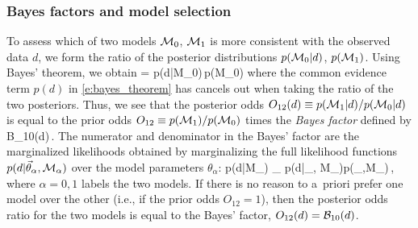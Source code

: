 \subsubsection{Bayes factors and model selection}
\label{s:bayes_factors}

To assess which of two models 
${\cal M}_0$, ${\cal M}_1$ is more consistent with
the observed data $d$, we form 
the ratio of the posterior distributions 
$p({\cal M}_0|d)$, $p({\cal M}_1)$.
Using Bayes' theorem, we obtain
\be
{} =
{p(d|{\cal M}_0)\,p({\cal M}_0)}
\ee
%
where the common evidence term $p(d)$ in
\eqref{e:bayes_theorem} has cancels out when taking
the ratio of the two posteriors.
Thus, we see that the posterior odds
$O_{12}(d)\equiv p({\cal M}_1|d)/p({\cal M}_0|d)$
is equal to the prior odds
$O_{12}\equiv p({\cal M}_1)/p({\cal M}_0)$
times the {\em Bayes factor} defined by
%
\be
{\cal B}_{10}(d)\equiv {}\,.
\label{e:bayes_factor}
\ee
%
The numerator and denominator in the Bayes' factor 
are the marginalized likelihoods obtained by 
marginalizing the full likelihood functions
$p(d|\vec\theta_\alpha,{\cal M}_\alpha)$ over the 
model parameters $\theta_\alpha$:
%
\be
p(d|{\cal M}_\alpha) \equiv
{}\theta_\alpha\>
p(d|\theta_\alpha, {\cal M}_\alpha)p(\theta_\alpha,{\cal M}_\alpha)\,,
\ee
%
where $\alpha=0,1$ labels the two models.
If there is no reason to a~priori prefer one model over 
the other (i.e., if the prior odds $O_{12}=1$), then the 
posterior odds ratio for the two models is equal to the 
Bayes' factor, $O_{12}(d) = {\cal B}_{10}(d)$.

